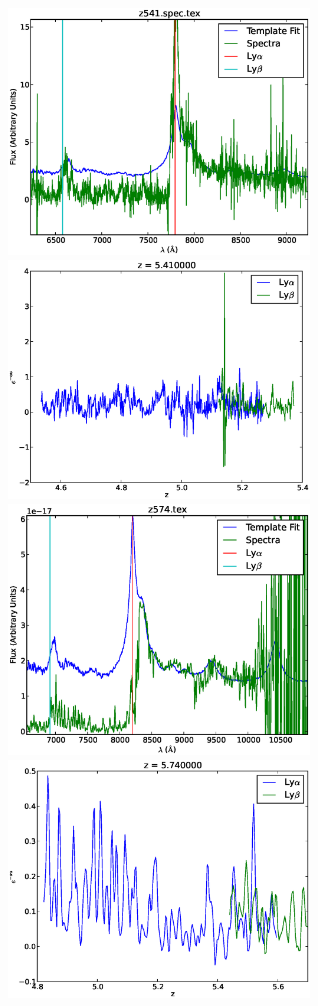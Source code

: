 \documentclass[11pt]{article}
\begin{document}
\begin{figure}[h]
  \centering
  \includegraphics[width=8cm]{z541.spec.eps}
  \includegraphics[width=8cm]{z541.spec_Transmission.eps}
  \includegraphics[width=8cm]{z574.eps}
  \includegraphics[width=8cm]{z574_Transmission.eps}

\end{figure}
\end{document}
